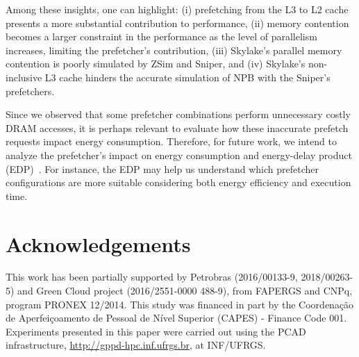\documentclass[AMA,final,STIX1COL]{WileyNJD-v2}
\begin{document}
{Among these insights, one can highlight: (i) prefetching from the L3 to L2 cache presents a more substantial contribution to performance, (ii) memory contention becomes a larger constraint in the performance as the level of parallelism increases, limiting the prefetcher's contribution, (iii) Skylake's parallel memory contention is poorly simulated by ZSim and Sniper, and (iv) Skylake's non-inclusive L3 cache hinders the accurate simulation of NPB with the Sniper's prefetchers.

Since we observed that some prefetcher combinations perform unnecessary costly DRAM accesses, it is perhaps relevant to evaluate how these inaccurate prefetch requests impact energy consumption. Therefore, for future work, we intend to analyze the prefetcher's impact on energy consumption and energy-delay product (EDP)~\cite{gonzalez1996edp}. For instance, the EDP may help us understand which prefetcher configurations are more suitable considering both energy efficiency and execution time.
}

\section*{Acknowledgements}
This work has been partially supported by Petrobras (2016/00133-9, 2018/00263-5) and Green Cloud project (2016/2551-0000 488-9), from FAPERGS and CNPq, program PRONEX 12/2014. This study was financed in part by the Coordenação de Aperfeiçoamento de Pessoal de Nível Superior (CAPES) - Finance Code 001. Experiments presented in this paper were carried out using the PCAD infrastructure, \url{http://gppd-hpc.inf.ufrgs.br}, at INF/UFRGS.


\end{document}
